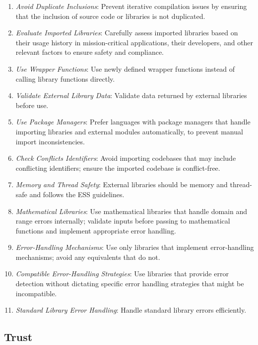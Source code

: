 \documentclass[9pt]{IEEEtran} %
\begin{document}
\begin{enumerate}
  \item \textit{Avoid Duplicate Inclusions}: Prevent iterative compilation issues by ensuring that the inclusion of source code or libraries is not duplicated.
  \item \textit{Evaluate Imported Libraries}: Carefully assess imported libraries based on their usage history in mission-critical applications, their developers, and other relevant factors to ensure safety and compliance.
  \item \textit{Use Wrapper Functions}: Use newly defined wrapper functions instead of calling library functions directly.
  \item \textit{Validate External Library Data}: Validate data returned by external libraries before use. 
  \item \textit{Use Package Managers}: Prefer languages with package managers that handle importing libraries and external modules automatically, to prevent manual import inconsistencies.
  \item \textit{Check Conflicts Identifiers}: Avoid importing codebases that may include conflicting identifiers; ensure the imported codebase is conflict-free.
  \item \textit{Memory and Thread Safety}: External libraries should be memory and thread-safe and follows the ESS guidelines.
  \item \textit{Mathematical Libraries}: Use mathematical libraries that handle domain and range errors internally; validate inputs before passing to mathematical functions and implement appropriate error handling.
  \item \textit{Error-Handling Mechanisms}: Use only libraries that implement error-handling mechanisms; avoid any equivalents that do not.
  \item \textit{Compatible Error-Handling Strategies}: Use libraries that provide error detection without dictating specific error handling strategies that might be incompatible.
  \item \textit{Standard Library Error Handling}: Handle standard library errors efficiently.
\end{enumerate}

\subsection{Trust}
\label{ESSTrust}
\end{document}
